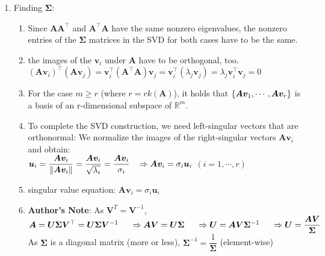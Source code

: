 \begin{enumerate}
    \item Finding $\bm{\Sigma}$:
    \begin{enumerate}
        \item Since $\bm{AA^\top}$ and $\bm{A ^\top A}$ have the same nonzero eigenvalues, the nonzero entries of the $\bm{\Sigma}$ matrices in the SVD for both cases have to be the same.
        \hfill \cite{mfml/book/mml/Deisenroth-Faisal-Ong}

        \item  the images of the $\bm{v}_i$ under $\bm{A}$ have to be orthogonal, too.
        \hfill \cite{mfml/book/mml/Deisenroth-Faisal-Ong}
        \\
        $
            (\bm{Av}_i)^\top (\bm{Av}_j ) = 
            \bm{v}^\top _i(\bm{A}^\top \bm{A})\bm{v}_j = 
            \bm{v}^\top _i(\lambda _j\bm{v}_j ) = 
            \lambda _j\bm{v}^\top _i \bm{v}_j 
            = 0
        $
        \hfill \cite{mfml/book/mml/Deisenroth-Faisal-Ong}

        \item For the case $m \geq r$ (where $r = rk(\bm{A})$), it holds that $\left\{\bm{Av}_1, \cdots , \bm{Av}_r\right\}$ is a basis of an r-dimensional subspace of $\mathbb{R}^m$.
        \hfill \cite{mfml/book/mml/Deisenroth-Faisal-Ong}

        \item To complete the SVD construction, we need left-singular vectors that are orthonormal: 
        We normalize the images of the right-singular vectors $\bm{Av}_i$ and obtain:
        \hfill \cite{mfml/book/mml/Deisenroth-Faisal-Ong}
        \\
        $
            \bm{u}_i = \dfrac{\bm{Av}_i}{\left\| \bm{Av}_i \right\|}
            = \dfrac{\bm{Av}_i}{\sqrt{\lambda_i}}
            = \dfrac{\bm{Av}_i}{\sigma_i}
            \hspace{0.3cm}
            \Rightarrow 
            \bm{Av}_i = \sigma_i \bm{u}_i
        $
        \hfill
        $
            (i = 1, \cdots , r)
        $
        \hfill \cite{mfml/book/mml/Deisenroth-Faisal-Ong}

        \item singular value equation: $\bm{Av}_i = \sigma_i \bm{u}_i$
        \hfill \cite{mfml/book/mml/Deisenroth-Faisal-Ong}
        
        \item \textbf{Author's Note}: As $\bm{V}^T = \bm{V}^{-1}$,
        \\
        $
            \bm{A} = \bm{U\Sigma V}^\top = \bm{U\Sigma V}^{-1}
            \hspace{0.5cm}
            \Rightarrow 
            \bm{AV} = \bm{U\Sigma} 
            \hspace{0.5cm}
            \Rightarrow 
            \bm{U} = \bm{AV\Sigma}^{-1} 
            \hspace{0.5cm}
            \Rightarrow 
            \bm{U} = \dfrac{\bm{AV}}{\bm{\Sigma}}
        $
        \\
        As $\bm{\Sigma}$ is a diagonal matrix (more or less), $\bm{\Sigma}^{-1} = \dfrac{1}{\bm{\Sigma}}$ (element-wise)


\end{enumerate}
\end{enumerate}
